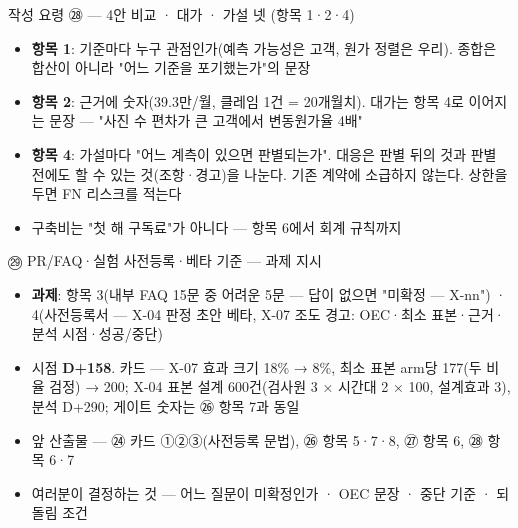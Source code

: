 \begin{frame}{작성 요령 ㉘ — 4안 비교 · 대가 · 가설 넷 (항목 1·2·4)}
\begin{itemize}
\item \textbf{항목 1}: 기준마다 누구 관점인가(예측 가능성은 고객, 원가 정렬은 우리). 종합은 합산이 아니라 "어느 기준을 포기했는가"의 문장
\item \textbf{항목 2}: 근거에 숫자(39.3만/월, 클레임 1건 = 20개월치). 대가는 항목 4로 이어지는 문장 — "사진 수 편차가 큰 고객에서 변동원가율 4배"
\item \textbf{항목 4}: 가설마다 "어느 계측이 있으면 판별되는가". 대응은 판별 뒤의 것과 판별 전에도 할 수 있는 것(조항·경고)을 나눈다. 기존 계약에 소급하지 않는다. 상한을 두면 FN 리스크를 적는다
\item 구축비는 "첫 해 구독료"가 아니다 — 항목 6에서 회계 규칙까지
\end{itemize}
\end{frame}

\begin{frame}{㉙ PR/FAQ·실험 사전등록·베타 기준 — 과제 지시}
\begin{itemize}
\item \textbf{과제}: 항목 3(내부 FAQ 15문 중 어려운 5문 — 답이 없으면 "미확정 — X-nn") · 4(사전등록서 — X-04 판정 초안 베타, X-07 조도 경고: OEC·최소 표본·근거·분석 시점·성공/중단)
\item 시점 \textbf{D+158}. 카드 — X-07 효과 크기 18\% → 8\%, 최소 표본 arm당 177(두 비율 검정) → 200; X-04 표본 설계 600건(검사원 3 × 시간대 2 × 100, 설계효과 3), 분석 D+290; 게이트 숫자는 ㉖ 항목 7과 동일
\item 앞 산출물 — ㉔ 카드 ①②③(사전등록 문법), ㉖ 항목 5·7·8, ㉗ 항목 6, ㉘ 항목 6·7
\item 여러분이 결정하는 것 — 어느 질문이 미확정인가 · OEC 문장 · 중단 기준 · 되돌림 조건
\end{itemize}
\end{frame}

